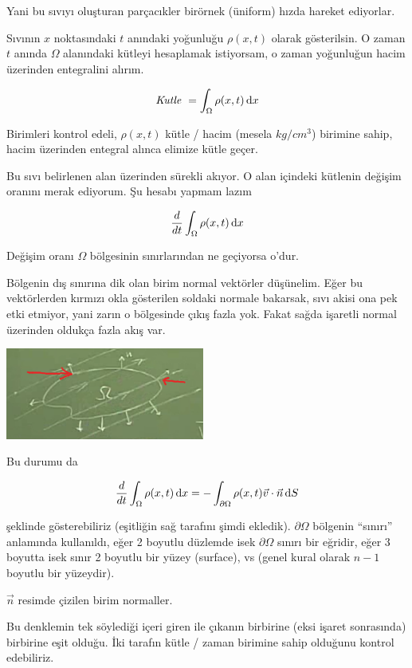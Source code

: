 \documentclass[12pt,fleqn]{article}\usepackage{../../common}
\begin{document}
Yani bu sıvıyı oluşturan parçacıkler birörnek (üniform) hızda hareket
ediyorlar. 

Sıvının $x$ noktasındaki $t$ anındaki yoğunluğu $\rho(x,t)$ olarak
gösterilsin. O zaman $t$ anında $\Omega$ alanındaki kütleyi hesaplamak
istiyorsam, o zaman yoğunluğun hacim üzerinden entegralini alırım. 

$$ \textit{Kutle } = \int_\Omega \rho(x,t) \,\mathrm{d} x $$

Birimleri kontrol edeli, $\rho(x,t)$ kütle / hacim (mesela $kg / cm^3$)
birimine sahip, hacim üzerinden entegral alınca elimize kütle geçer. 

Bu sıvı belirlenen alan üzerinden sürekli akıyor. O alan içindeki kütlenin
değişim oranını merak ediyorum. Şu hesabı yapmam lazım

$$ \frac{d}{dt} \int_\Omega \rho(x,t) \,\mathrm{d} x   $$

Değişim oranı $\Omega$ bölgesinin sınırlarından ne geçiyorsa o'dur. 

Bölgenin dış sınırına dik olan birim normal vektörler düşünelim. Eğer bu
vektörlerden kırmızı okla gösterilen soldaki normale bakarsak, sıvı akisi
ona pek etki etmiyor, yani zarın o bölgesinde çıkış fazla yok. Fakat sağda
işaretli normal üzerinden oldukça fazla akış var.

\includegraphics[height=3cm]{1_2.png}

Bu durumu da

$$ \frac{d}{dt} \int_\Omega \rho(x,t) \,\mathrm{d} x   = 
- \int_{\partial \Omega} \rho(x,t) \vec{v} \cdot \vec{n} \,\mathrm{d} S 
$$

şeklinde gösterebiliriz (eşitliğin sağ tarafını şimdi ekledik). $\partial
\Omega$ bölgenin ``sınırı'' anlamında kullanıldı, eğer 2 boyutlu düzlemde isek
$\partial \Omega$ sınırı bir eğridir, eğer 3 boyutta isek sınır 2 boyutlu bir
yüzey (surface), vs (genel kural olarak $n-1$ boyutlu bir yüzeydir).

$\vec{n}$ resimde çizilen birim normaller. 

Bu denklemin tek söylediği içeri giren ile çıkanın birbirine (eksi işaret
sonrasında) birbirine eşit olduğu. İki tarafın kütle / zaman birimine sahip
olduğunu kontrol edebiliriz. 
\end{document}
